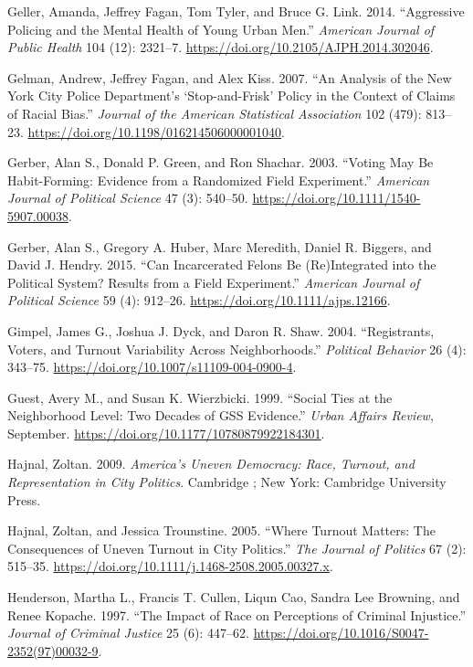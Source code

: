 \documentclass[
  12pt,
]{article}
\newlength{\cslhangindent}
\newenvironment{cslreferences}%
  {\setlength{\parindent}{0pt}%
  \everypar{\setlength{\hangindent}{\cslhangindent}}\ignorespaces}%
  {\par}
\begin{document}
\begin{cslreferences}
\leavevmode\hypertarget{ref-Geller2014}{}%
Geller, Amanda, Jeffrey Fagan, Tom Tyler, and Bruce G. Link. 2014. ``Aggressive Policing and the Mental Health of Young Urban Men.'' \emph{American Journal of Public Health} 104 (12): 2321--7. \url{https://doi.org/10.2105/AJPH.2014.302046}.

\leavevmode\hypertarget{ref-Gelman2007}{}%
Gelman, Andrew, Jeffrey Fagan, and Alex Kiss. 2007. ``An Analysis of the New York City Police Department's `Stop-and-Frisk' Policy in the Context of Claims of Racial Bias.'' \emph{Journal of the American Statistical Association} 102 (479): 813--23. \url{https://doi.org/10.1198/016214506000001040}.

\leavevmode\hypertarget{ref-Gerber2003}{}%
Gerber, Alan S., Donald P. Green, and Ron Shachar. 2003. ``Voting May Be Habit-Forming: Evidence from a Randomized Field Experiment.'' \emph{American Journal of Political Science} 47 (3): 540--50. \url{https://doi.org/10.1111/1540-5907.00038}.

\leavevmode\hypertarget{ref-Gerber2015}{}%
Gerber, Alan S., Gregory A. Huber, Marc Meredith, Daniel R. Biggers, and David J. Hendry. 2015. ``Can Incarcerated Felons Be (Re)Integrated into the Political System? Results from a Field Experiment.'' \emph{American Journal of Political Science} 59 (4): 912--26. \url{https://doi.org/10.1111/ajps.12166}.

\leavevmode\hypertarget{ref-Gimpel2004}{}%
Gimpel, James G., Joshua J. Dyck, and Daron R. Shaw. 2004. ``Registrants, Voters, and Turnout Variability Across Neighborhoods.'' \emph{Political Behavior} 26 (4): 343--75. \url{https://doi.org/10.1007/s11109-004-0900-4}.

\leavevmode\hypertarget{ref-Guest1999}{}%
Guest, Avery M., and Susan K. Wierzbicki. 1999. ``Social Ties at the Neighborhood Level: Two Decades of GSS Evidence.'' \emph{Urban Affairs Review}, September. \url{https://doi.org/10.1177/10780879922184301}.

\leavevmode\hypertarget{ref-Hajnal2009}{}%
Hajnal, Zoltan. 2009. \emph{America's Uneven Democracy: Race, Turnout, and Representation in City Politics}. Cambridge ; New York: Cambridge University Press.

\leavevmode\hypertarget{ref-Hajnal2005}{}%
Hajnal, Zoltan, and Jessica Trounstine. 2005. ``Where Turnout Matters: The Consequences of Uneven Turnout in City Politics.'' \emph{The Journal of Politics} 67 (2): 515--35. \url{https://doi.org/10.1111/j.1468-2508.2005.00327.x}.

\leavevmode\hypertarget{ref-Henderson1997}{}%
Henderson, Martha L., Francis T. Cullen, Liqun Cao, Sandra Lee Browning, and Renee Kopache. 1997. ``The Impact of Race on Perceptions of Criminal Injustice.'' \emph{Journal of Criminal Justice} 25 (6): 447--62. \url{https://doi.org/10.1016/S0047-2352(97)00032-9}.


\end{cslreferences}
\end{document}
